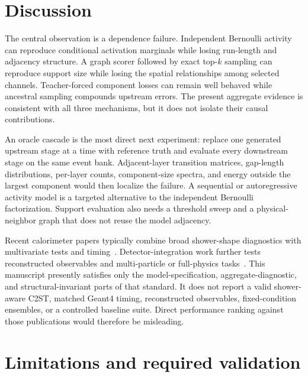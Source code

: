 \documentclass[11pt]{article}
\begin{document}
\section{Discussion}

The central observation is a dependence failure. Independent Bernoulli activity can reproduce conditional activation marginals while losing run-length and adjacency structure. A graph scorer followed by exact top-$k$ sampling can reproduce support size while losing the spatial relationships among selected channels. Teacher-forced component losses can remain well behaved while ancestral sampling compounds upstream errors. The present aggregate evidence is consistent with all three mechanisms, but it does not isolate their causal contributions.

An oracle cascade is the most direct next experiment: replace one generated upstream stage at a time with reference truth and evaluate every downstream stage on the same event bank. Adjacent-layer transition matrices, gap-length distributions, per-layer counts, component-size spectra, and energy outside the largest component would then localize the failure. A sequential or autoregressive activity model is a targeted alternative to the independent Bernoulli factorization. Support evaluation also needs a threshold sweep and a physical-neighbor graph that does not reuse the model adjacency.

Recent calorimeter papers typically combine broad shower-shape diagnostics with multivariate tests and timing~\cite{calochallenge,calodream,caloclouds3}. Detector-integration work further tests reconstructed observables and multi-particle or full-physics tasks~\cite{physicsbenchmark}. This manuscript presently satisfies only the model-specification, aggregate-diagnostic, and structural-invariant parts of that standard. It does not report a valid shower-aware C2ST, matched Geant4 timing, reconstructed observables, fixed-condition ensembles, or a controlled baseline suite. Direct performance ranking against those publications would therefore be misleading.

\section{Limitations and required validation}
\label{sec:limitations}
\end{document}
